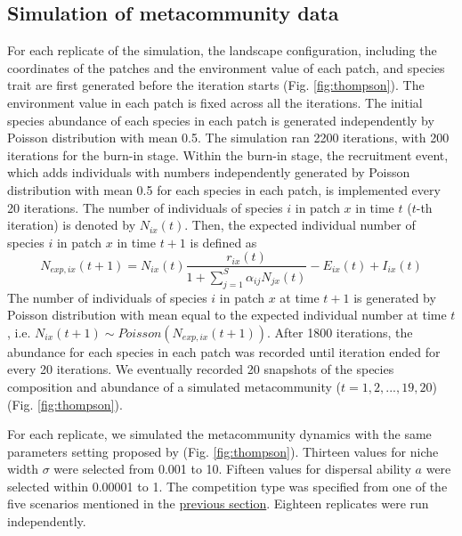 	\subsection{Simulation of metacommunity data}
	\noindent
	For each replicate of the simulation, the landscape configuration, including the coordinates of the patches and the environment value of each patch, and species trait are first generated before the iteration starts (Fig. \ref{fig:thompson}). The environment value in each patch is fixed across all the iterations. The initial species abundance of each species in each patch is generated independently by Poisson distribution with mean 0.5. The simulation ran 2200 iterations, with 200 iterations for the burn-in stage. Within the burn-in stage, the recruitment event, which adds individuals with numbers independently generated by Poisson distribution with mean 0.5 for each species in each patch, is implemented every 20 iterations. The number of individuals of species $i$ in patch $x$ in time $t$ ($t$-th iteration) is denoted by $N_{ix}(t)$. Then, the expected individual number of species $i$ in patch $x$ in time $t+1$ is defined as 
	\[
	N_{exp,ix}(t+1) = N_{ix}(t)\dfrac{r_{ix}(t)}{1+\sum_{j = 1}^S\alpha_{ij}N_{jx}(t)} - E_{ix}(t)+I_{ix}(t)
	\]
	The number of individuals of species $i$ in patch $x$ at time $t+1$ is generated by Poisson distribution with mean equal to the expected individual number at time $t$, i.e. $N_{ix}(t+1)\sim Poisson(N_{exp,ix}(t+1))$. After 1800 iterations, the abundance for each species in each patch was recorded until iteration ended for every 20 iterations. We eventually recorded 20 snapshots of the species composition and abundance of a simulated metacommunity ($t = 1,2,...,19,20$) (Fig. \ref{fig:thompson}). 
	
	For each replicate, we simulated the metacommunity dynamics with the same parameters setting proposed by \citet{thompson2020process} (Fig. \ref{fig:thompson}). Thirteen values for niche width $\sigma$ were selected from 0.001 to 10. Fifteen values for dispersal ability $a$ were selected within 0.00001 to 1. The competition type was specified from one of the five scenarios mentioned in the \hyperref[Modelc]{previous section}. Eighteen replicates were run independently.
	
